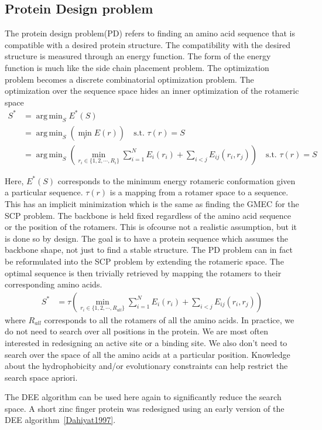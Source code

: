 \documentclass[a4]{article}
\DeclareMathOperator*{\argmin}{arg\,min}
\begin{document}
\subsection{Protein Design problem}
The protein design problem(PD) refers to finding an amino acid sequence that is compatible with a desired protein structure. The compatibility with the desired structure is measured through an energy function. The form of the energy function is much like the side chain placement problem. The optimization problem becomes a discrete combinatorial optimization problem. The optimization over the sequence space hides an inner optimization of the rotameric space
\[
\begin{split}
S^* &= \argmin_{S} E^*(S) \\
	&= \argmin_{S} \left( \min_{r} E(r) \right) \quad \text{s.t. $\tau(r)=S$} \\
	&= \argmin_{S} \left( \min_{r_i \in \{1,2,\cdots,R_i\}} \sum_{i=1}^{N}E_i(r_i) + \sum_{i<j}E_{ij}(r_i,r_j) \right) \quad \text{s.t. $\tau(r)=S$}
\end{split}
\]

Here, $E^*(S)$ corresponds to the minimum energy rotameric conformation given a particular sequence. $\tau(r)$ is a mapping from a rotamer space to a sequence. This has an implicit minimization which is the same as finding the GMEC for the SCP problem. The backbone is held fixed regardless of the amino acid sequence or the position of the rotamers. This is  ofcourse not a realistic assumption, but it is done so by design. The goal is to have a protein sequence which assumes the backbone shape, not just to find a stable structure. The PD problem can in fact be reformulated into the SCP problem by extending the rotameric space. The optimal sequence is then trivially retrieved by mapping the rotamers to their corresponding amino acids.
\[
\begin{split}
S^* &= \tau\left( \min_{r_i \in \{1,2,\cdots,R_{all}\}} \sum_{i=1}^{N}E_i(r_i) + \sum_{i<j}E_{ij}(r_i,r_j) \right)
\end{split}
\]
where $R_{all}$ corresponds to all the rotamers of all the amino acids. In practice, we do not need to search over all positions in the protein. We are most often interested in redesigning an active site or a binding site. We also don't need to search over the space of all the amino acids at a particular position. Knowledge about the hydrophobicity and/or evolutionary constraints can help restrict the search space apriori. 


The DEE algorithm can be used here again to significantly reduce the search space. A short zinc finger protein was redesigned using an early version of the DEE algorithm~\ref{Dahiyat1997}. 
\end{document}
